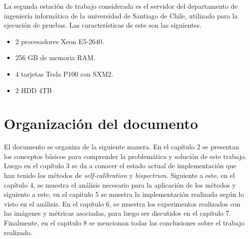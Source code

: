 La segunda estación de trabajo considerada es el servidor del departamento de ingeniería informática de la universidad de Santiago de Chile, utilizado para la ejecución de pruebas. Las características de este son las siguientes. 

\begin{itemize}
    \item 2 procesadores Xeon E5-2640.
    \item 256 GB de memoria RAM. 
    \item 4 tarjetas Tesla P100 con SXM2.
    \item 2 HDD 4TB
\end{itemize}


\section{Organizaci\'on del documento}
\label{intro:organizacion}

El documento se organiza de la siguiente manera. En el capítulo 2 se presentan los conceptos básicos para comprender la problemática y solución de este trabajo. Luego en el capítulo 3 se da a conocer el estado actual de implementación que han tenido los métodos de \textit{self-calibration} y \textit{bispectrum}. Siguiente a este, en el capítulo 4, se muestra el análisis necesario para la aplicación de los métodos y siguiente a este, en el capitulo 5 se muestra la implementación realizada según lo visto en el análisis. En el capitulo 6, se muestra los experimentos realizados con las imágenes y métricas asociadas, para luego ser discutidos en el capitulo 7. Finalmente, en el capitulo 8 se mencionan todas las conclusiones sobre el trabajo realizado. 